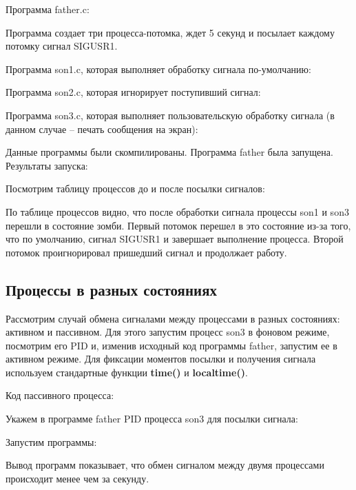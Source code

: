 \documentclass[a4paper]{article}
\begin{document}
	Программа father.c:
	
	
	Программа создает три процесса-потомка, ждет 5 секунд и посылает каждому потомку сигнал SIGUSR1.
	
	Программа son1.c, которая выполняет обработку сигнала по-умолчанию:
	
	
	Программа son2.c, которая игнорирует поступивший сигнал:
	
	
	Программа son3.c, которая выполняет пользовательскую обработку сигнала (в данном случае -- печать сообщения на экран):
	
	
	Данные программы были скомпилированы. Программа father была запущена. Результаты запуска:	
	
	
	Посмотрим таблицу процессов до и после посылки сигналов:
	
	
	По таблице процессов видно, что после обработки сигнала процессы son1 и son3 перешли в состояние зомби. Первый потомок перешел в это состояние из-за того, что по умолчанию, сигнал SIGUSR1 и  завершает выполнение процесса. Второй потомок проигнорировал пришедший сигнал и продолжает работу.
	
	\subsection{Процессы в разных состояниях}
	Рассмотрим случай обмена сигналами между процессами в разных состояниях: активном и пассивном. Для этого запустим процесс son3 в фоновом режиме, посмотрим его PID и, изменив исходный код программы father, запустим ее в активном режиме. Для фиксации моментов посылки и получения сигнала используем стандартные функции \textbf{time()} и \textbf{localtime()}.
	
	Код пассивного процесса:
	

	Укажем в программе father PID процесса son3 для посылки сигнала:
	
	
	Запустим программы:
	
	
	Вывод программ показывает, что обмен сигналом между двумя процессами происходит менее чем за секунду.
	
\end{document}
